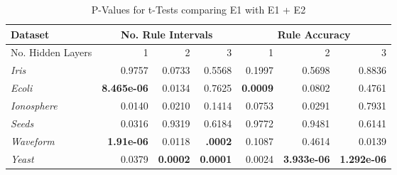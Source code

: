 \begin{table*}[t!]
  \centering
  \begin{tabular}{|l|r|r|r|r|r|r|}
    \hline
    Dataset & 
    \multicolumn{3}{c|}{No. Rule Intervals} &
    \multicolumn{3}{c|}{Rule Accuracy} \\
    \cline{2-7}
    \hline
    No. Hidden Layers & 1 & 2 & 3 & 1 & 2 & 3 \\
    \hline
    \textit{Iris} & 0.9757 & 0.0733 & 0.5568 & 0.1997 & 0.5698 & 0.8836 \\
    \textit{Ecoli} & \textbf{8.465e-06} & 0.0134 & 0.7625 &\textbf{0.0009} & 0.0802 & 0.4761 \\
    \textit{Ionosphere} & 0.0140& 0.0210& 0.1414&0.0753 & 0.0291& 0.7931\\
    \textit{Seeds} & 0.0316 & 0.9319 & 0.6184 &0.9772 & 0.9481 & 0.6141 \\
    \textit{Waveform} & \textbf{1.91e-06}& 0.0118& \textbf{.0002} & 0.1087 & 0.4614 &0.0139\\
    \textit{Yeast} &0.0379 &\textbf{0.0002}&\textbf{0.0001}&0.0024 & \textbf{3.933e-06}& \textbf{1.292e-06}\\
    \hline
  \end{tabular}
  \caption{P-Values for t-Tests comparing E1 with E1 + E2}
  \label{tab:pval_results}  
\end{table*}
